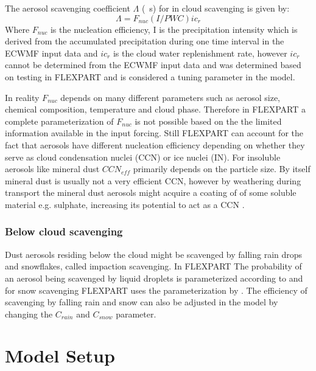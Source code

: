 The aerosol scavenging coefficient $\Lambda$ (\si{\per\s}) for in cloud scavenging is given by:
\begin{equation}
    \Lambda = F_{nuc}\left(I/PWC\right)ic_r
\end{equation}
Where $F_{nuc}$ is the nucleation efficiency, I is the precipitation intensity which is derived from the accumulated precipitation during one time interval in the ECWMF input data and $ic_r$ is the cloud water replenishment rate,  however $ic_r$ cannot be determined from the ECWMF input data and was determined based on testing in FLEXPART and is considered a tuning parameter in the model.   

In reality $F_{nuc}$ depends on many different parameters such as aerosol size, chemical composition, temperature and cloud phase. Therefore in FLEXPART a complete parameterization of $F_{nuc}$ is not possible based on the the limited information available in the input forcing. Still FLEXPART can account for the fact that aerosols have different nucleation efficiency depending on whether they serve as cloud condensation nuclei (CCN) or ice nuclei (IN). For insoluble aerosols like mineral dust $CCN_{eff}$ primarily depends on the particle size. By itself mineral dust is usually not a very efficient CCN, however by weathering during transport the mineral dust aerosols might acquire a coating of of some soluble material e.g. sulphate, increasing its potential to act as a CCN \textcite{Dust_aerosols_coating2001}.     

\subsubsection{Below cloud scavenging}
Dust aerosols residing below the cloud might be scavenged by falling rain drops and snowflakes, called impaction scavenging. In FLEXPART The probability of an aerosol being scavenged by liquid droplets is parameterized according to \textcite{laakso2003ultrafine} and for snow scavenging FLEXPART uses the parameterization by \textcite{kyro2009snow}. The efficiency of scavenging by falling rain and snow can also be adjusted in the model by changing the $C_{rain}$ and $C_{snow}$ parameter.   


\section{Model Setup}\label{sec:Model_setup}

